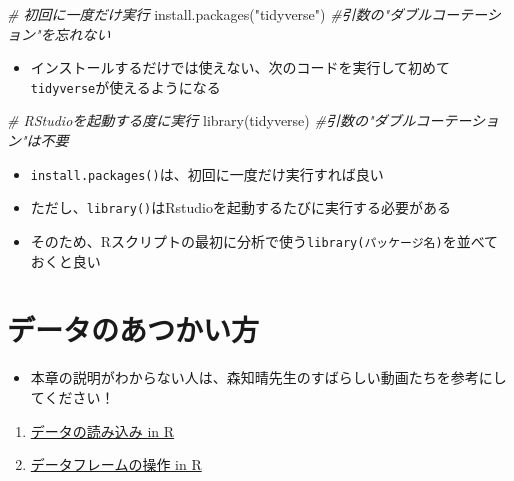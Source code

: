 \documentclass[
]{book}
\newenvironment{Shaded}{\begin{snugshade}}{\end{snugshade}}
\newcommand{\CommentTok}[1]{\textcolor[rgb]{0.56,0.35,0.01}{\textit{#1}}}
\newcommand{\FunctionTok}[1]{\textcolor[rgb]{0.00,0.00,0.00}{#1}}
\newcommand{\NormalTok}[1]{#1}
\newcommand{\StringTok}[1]{\textcolor[rgb]{0.31,0.60,0.02}{#1}}
\providecommand{\tightlist}{%
  \setlength{\itemsep}{0pt}\setlength{\parskip}{0pt}}
\begin{document}
\begin{Shaded}
\begin{Highlighting}[]
\CommentTok{\# 初回に一度だけ実行}
\FunctionTok{install.packages}\NormalTok{(}\StringTok{"tidyverse"}\NormalTok{) }\CommentTok{\#引数の"ダブルコーテーション"を忘れない}
\end{Highlighting}
\end{Shaded}

\begin{itemize}
\tightlist
\item
  インストールするだけでは使えない、次のコードを実行して初めて\texttt{tidyverse}が使えるようになる
\end{itemize}

\begin{Shaded}
\begin{Highlighting}[]
\CommentTok{\# RStudioを起動する度に実行}
\FunctionTok{library}\NormalTok{(tidyverse) }\CommentTok{\#引数の"ダブルコーテーション"は不要}
\end{Highlighting}
\end{Shaded}

\begin{itemize}
\tightlist
\item
  \texttt{install.packages()}は、初回に一度だけ実行すれば良い
\item
  ただし、\texttt{library()}はRstudioを起動するたびに実行する必要がある
\item
  そのため、Rスクリプトの最初に分析で使う\texttt{library(パッケージ名)}を並べておくと良い
\end{itemize}

\hypertarget{ux30c7ux30fcux30bfux306eux3042ux3064ux304bux3044ux65b9}{%
\chapter{データのあつかい方}\label{ux30c7ux30fcux30bfux306eux3042ux3064ux304bux3044ux65b9}}

\begin{itemize}
\tightlist
\item
  本章の説明がわからない人は、森知晴先生のすばらしい動画たちを参考にしてください！
\end{itemize}

\begin{enumerate}
\def\labelenumi{\arabic{enumi}.}
\tightlist
\item
  \href{https://youtu.be/FugazO_rL7c}{データの読み込み in R}\\
\item
  \href{https://youtu.be/96AZJmGNass}{データフレームの操作 in R}
\end{enumerate}
\end{document}
